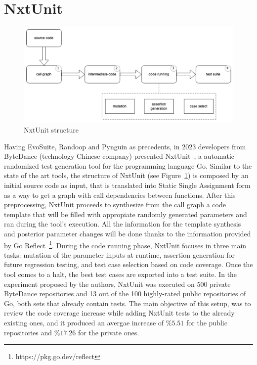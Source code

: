\documentclass[%
  chapterprefix=false,%
  open=right,%
  twoside=true,%
  paper=a4,%
  logofile={Figures/logo.png},%
  thesistype=master,%
  UKenglish,%
]{se2thesis}
\begin{document}
\section{NxtUnit}

\begin{figure}[bt]
  \centering
  \includegraphics[width=.99\textwidth]{Figures/nxtunit.png}
  \caption{NxtUnit structure}\label{fig:nxt}
\end{figure}

Having EvoSuite, Randoop and Pynguin as precedents, in 2023 developers from ByteDance (technology Chinese company) presented NxtUnit~\cite{DBLP:conf/ease/WangMCGSP23}, a automatic randomized test generation tool for the programming language Go.
Similar to the state of the art tools, the structure of NxtUnit (see Figure~\ref{fig:nxt}) is composed by an initial source code as input, that is translated into Static Single Assignment form as a way to get a graph with call dependencies between functions.
After this preprocessing, NxtUnit proceeds to synthesize from the call graph a code template that will be filled with appropiate randomly generated parameters and ran during the tool's execution.
All the information for the template synthesis and posterior parameter changes will be done thanks to the information provided by Go Reflect~\footnote{https://pkg.go.dev/reflect}.
During the code running phase, NxtUnit focuses in three main tasks: mutation of the parameter inputs at runtime, assertion generation for future regression testing, and test case selection based on code coverage.
Once the tool comes to a halt, the best test cases are exported into a test suite.
In the experiment proposed by the authors, NxtUnit was executed on 500 private ByteDance repositories and 13 out of the 100 highly-rated public repositories of Go, both sets that already contain tests.
The main objective of this setup, was to review the code coverage increase while adding NxtUnit tests to the already existing ones, and it produced an avergae increase of $\%5.51$ for the public repositories and $\%17.26$ for the private ones.
\end{document}
